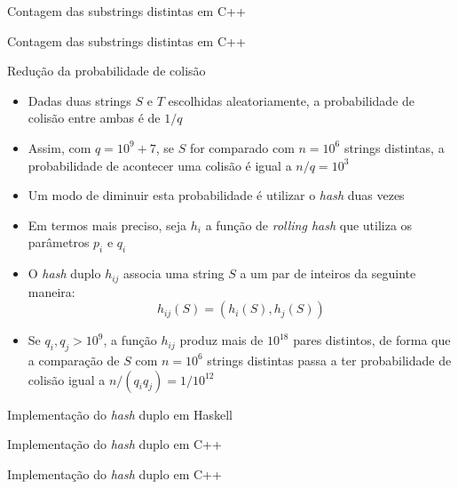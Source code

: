 \begin{frame}[fragile]{Contagem das substrings distintas em C++}
\end{frame}

\begin{frame}[fragile]{Contagem das substrings distintas em C++}
\end{frame}

\begin{frame}[fragile]{Redução da probabilidade de colisão}

    \begin{itemize}
        \item Dadas duas strings $S$ e $T$ escolhidas aleatoriamente, a probabilidade de
            colisão entre ambas é de $1/q$
        \pause


        \item Assim, com $q = 10^9 + 7$, se $S$ for comparado com $n = 10^6$ strings distintas,
            a probabilidade de acontecer uma colisão é igual a $n/q = 10^3$
        \pause


        \item Um modo de diminuir esta probabilidade é utilizar o \textit{hash} duas vezes
        \pause


        \item Em termos mais preciso, seja $h_i$ a função de \textit{rolling hash} que utiliza
            os parâmetros $p_i$ e $q_i$
        \pause


        \item O \textit{hash} duplo $h_{ij}$ associa uma string $S$ a um par de inteiros da 
            seguinte maneira:
            \[
                h_{ij}(S) = (h_i(S), h_j(S))
            \]
        \pause


        \item Se $q_i, q_j > 10^9$, a função $h_{ij}$ produz mais de $10^{18}$ pares distintos,
            de forma que a comparação de $S$ com $n = 10^6$ strings distintas passa a ter
            probabilidade de colisão igual a $n/(q_iq_j) = 1/10^{12}$
    \end{itemize}

\end{frame}

\begin{frame}[fragile]{Implementação do {\it hash} duplo em Haskell}
\end{frame}

\begin{frame}[fragile]{Implementação do {\it hash} duplo em C++}
\end{frame}

\begin{frame}[fragile]{Implementação do {\it hash} duplo em C++}
\end{frame}

